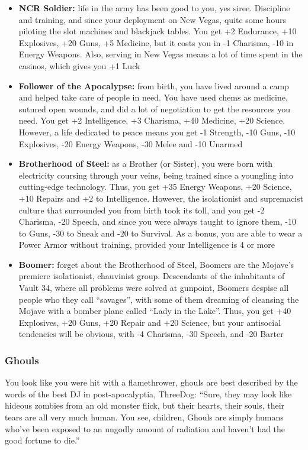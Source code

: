 \documentclass[11pt]{article} %
\begin{document}
\begin{itemize}
\item \textbf{NCR Soldier:} life in the army has been good to you, yes siree. Discipline and training, and since your deployment on New Vegas, quite some hours piloting the slot machines and blackjack tables. You get +2 Endurance, +10 Explosives, +20 Guns, +5 Medicine, but it costs you in -1 Charisma, -10 in Energy Weapons. Also, serving in New Vegas means a lot of time spent in the casinos, which gives you +1 Luck
\item \textbf{Follower of the Apocalypse:} from birth, you have lived around a camp and helped take care of people in need. You have used chems as medicine, sutured open wounds, and did a lot of negotiation to get the resources you need. You get +2 Intelligence, +3 Charisma, +40 Medicine, +20 Science. However, a life dedicated to peace means you get -1 Strength, -10 Guns, -10 Explosives, -20 Energy Weapons, -30 Melee and -10 Unarmed
\item \textbf{Brotherhood of Steel:} as a Brother (or Sister), you were born with electricity coursing through your veins, being trained since a youngling into cutting-edge technology. Thus, you get +35 Energy Weapons, +20 Science, +10 Repairs and +2 to Intelligence. However, the isolationist and supremacist culture that surrounded you from birth took its toll, and you get -2 Charisma, -20 Speech, and since you were always taught to ignore them, -10 to Guns, -30 to Sneak and -20 to Survival. As a bonus, you are able to wear a Power Armor without training, provided your Intelligence is 4 or more
\item \textbf{Boomer:} forget about the Brotherhood of Steel, Boomers are the Mojave's premiere isolationist, chauvinist group. Descendants of the inhabitants of Vault 34, where all problems were solved at gunpoint, Boomers despise all people who they call ``savages'', with some of them dreaming of cleansing the Mojave with a bomber plane called ``Lady in the Lake''. Thus, you get +40 Explosives, +20 Guns, +20 Repair and +20 Science, but your antisocial tendencies will be obvious, with -4 Charisma, -30 Speech, and -20 Barter
\end{itemize}

\subsubsection{Ghouls}

You look like you were hit with a flamethrower, ghouls are best described by the words of the best DJ in post-apocalyptia, ThreeDog: ``Sure, they may look like hideous zombies from an old monster flick, but their hearts, their souls, their tears are all very much human. You see, children, Ghouls are simply humans who've been exposed to an ungodly amount of radiation and haven't had the good fortune to die.'' 
\end{document}
